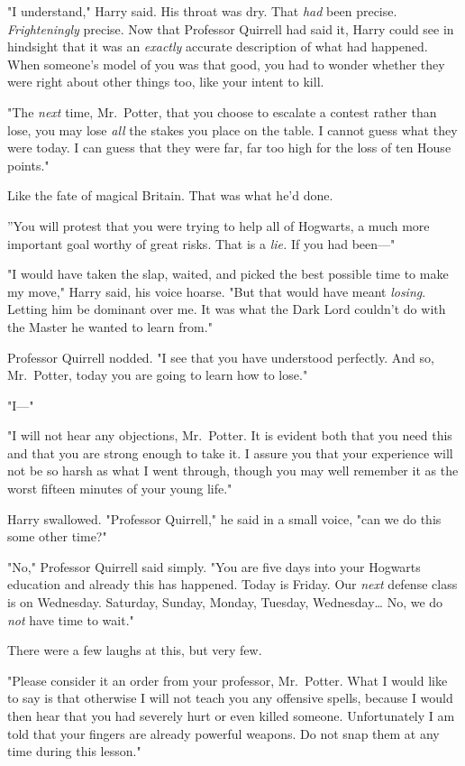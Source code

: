 "I understand," Harry said. His throat was dry. That \emph{had} been precise. \emph{Frighteningly} precise. Now that Professor Quirrell had said it, Harry could see in hindsight that it was an \emph{exactly} accurate description of what had happened. When someone's model of you was that good, you had to wonder whether they were right about other things too, like your intent to kill.

"The \emph{next} time, Mr.~Potter, that you choose to escalate a contest rather than lose, you may lose \emph{all} the stakes you place on the table. I cannot guess what they were today. I can guess that they were far, far too high for the loss of ten House points."

Like the fate of magical Britain. That was what he'd done.

''You will protest that you were trying to help all of Hogwarts, a much more important goal worthy of great risks. That is a \emph{lie.} If you had been---"

"I would have taken the slap, waited, and picked the best possible time to make my move," Harry said, his voice hoarse. "But that would have meant \emph{losing}. Letting him be dominant over me. It was what the Dark Lord couldn't do with the Master he wanted to learn from."

Professor Quirrell nodded. "I see that you have understood perfectly. And so, Mr.~Potter, today you are going to learn how to lose."

"I---"

"I will not hear any objections, Mr.~Potter. It is evident both that you need this and that you are strong enough to take it. I assure you that your experience will not be so harsh as what I went through, though you may well remember it as the worst fifteen minutes of your young life."

Harry swallowed. "Professor Quirrell," he said in a small voice, "can we do this some other time?"

"No," Professor Quirrell said simply. "You are five days into your Hogwarts education and already this has happened. Today is Friday. Our \emph{next} defense class is on Wednesday. Saturday, Sunday, Monday, Tuesday, Wednesday{\ldots} No, we do \emph{not} have time to wait."

There were a few laughs at this, but very few.

"Please consider it an order from your professor, Mr.~Potter. What I would like to say is that otherwise I will not teach you any offensive spells, because I would then hear that you had severely hurt or even killed someone. Unfortunately I am told that your fingers are already powerful weapons. Do not snap them at any time during this lesson."

